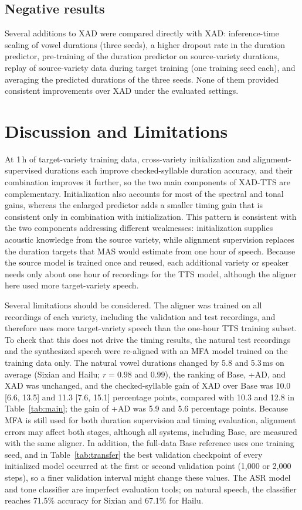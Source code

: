 \documentclass[conference,a4paper]{IEEEtran}
\begin{document}
\subsection{Negative results}
Several additions to XAD were compared directly with XAD: inference-time scaling of vowel durations (three seeds), a higher dropout rate in the duration predictor, pre-training of the duration predictor on source-variety durations, replay of source-variety data during target training (one training seed each), and averaging the predicted durations of the three seeds. None of them provided consistent improvements over XAD under the evaluated settings.

\section{Discussion and Limitations}
At 1\,h of target-variety training data, cross-variety initialization and alignment-supervised durations each improve checked-syllable duration accuracy, and their combination improves it further, so the two main components of XAD-TTS are complementary. Initialization also accounts for most of the spectral and tonal gains, whereas the enlarged predictor adds a smaller timing gain that is consistent only in combination with initialization. This pattern is consistent with the two components addressing different weaknesses: initialization supplies acoustic knowledge from the source variety, while alignment supervision replaces the duration targets that MAS would estimate from one hour of speech. Because the source model is trained once and reused, each additional variety or speaker needs only about one hour of recordings for the TTS model, although the aligner here used more target-variety speech.

Several limitations should be considered. The aligner was trained on all recordings of each variety, including the validation and test recordings, and therefore uses more target-variety speech than the one-hour TTS training subset. To check that this does not drive the timing results, the natural test recordings and the synthesized speech were re-aligned with an MFA model trained on the training data only. The natural vowel durations changed by 5.8 and 5.3\,ms on average (Sixian and Hailu; $r=0.98$ and $0.99$), the ranking of Base, +AD, and XAD was unchanged, and the checked-syllable gain of XAD over Base was 10.0 [6.6, 13.5] and 11.3 [7.6, 15.1] percentage points, compared with 10.3 and 12.8 in Table~\ref{tab:main}; the gain of +AD was 5.9 and 5.6 percentage points. Because MFA is still used for both duration supervision and timing evaluation, alignment errors may affect both stages, although all systems, including Base, are measured with the same aligner. In addition, the full-data Base reference uses one training seed, and in Table~\ref{tab:transfer} the best validation checkpoint of every initialized model occurred at the first or second validation point (1{,}000 or 2{,}000 steps), so a finer validation interval might change these values. The ASR model and tone classifier are imperfect evaluation tools; on natural speech, the classifier reaches 71.5\% accuracy for Sixian and 67.1\% for Hailu.
\end{document}
